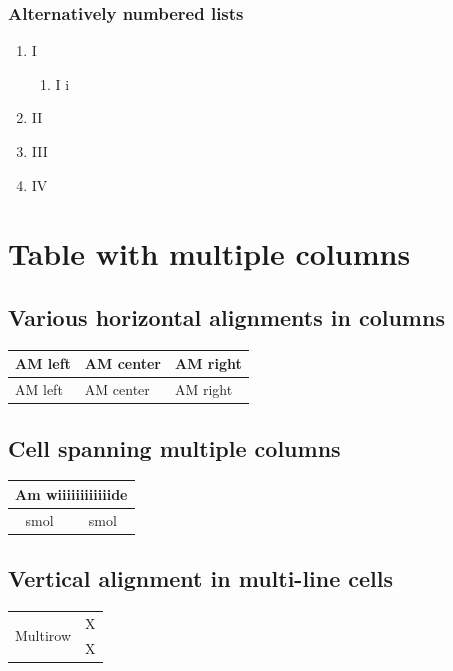 \documentclass{article}
\begin{document}
\subsubsection{Alternatively numbered lists}
\begin{enumerate}[label*=\Roman*.]
    \item I
    \begin{enumerate}[label*=\roman*.]
        \item I i
    \end{enumerate}
    \item II
    \item III
    \item IV
\end{enumerate}

\section{Table with multiple columns}
\subsection{Various horizontal alignments in columns}
\centering
\begin{tabularx}{0.8\textwidth} { 
  | >{\raggedright\arraybackslash}X 
  | >{\centering\arraybackslash}X 
  | >{\raggedleft\arraybackslash}X | }
 \hline
 AM left & AM center & AM right \\
 \hline
 AM left & AM center & AM right  \\
 \hline
\end{tabularx}
\raggedright

\subsection{Cell spanning multiple columns}
\begin{tabular}{|c|c|}
    \hline
    \multicolumn{2}{|c|}{Am wiiiiiiiiiiiide}\\
    \hline
    smol & smol\\
    \hline
\end{tabular}
\raggedright

\subsection{Vertical alignment in multi-line cells}
\begin{table}[ht]
\centering
\begin{tabular}{cc}
    \hline
    \multirow{2}{*}{Multirow}&X\\
    &X\\
    \hline
\end{tabular}
\label{tab:multiline}
\end{table}
\raggedright
\end{document}
